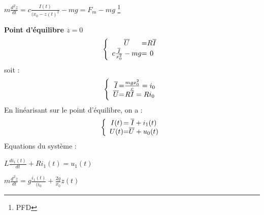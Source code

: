 {{{{\begin{center}
    \Large{$
    m\frac{d^{2}z}{dt} = c\frac{I(t)}{(x_{0} - z(t)^{2}} - mg = F_{m} - mg
    $} \footnote{PFD}
\end{center}
\large{
\textbf{Point d'équilibre $\overline{z} = 0$}
}
\large{
    \[
\left \{
\begin{array}{c @{=} c}
    \overline{U} & R\overline{I} \\
    c\frac{\overline{I}}{x_{0}^{2}} - mg & 0
\end{array}
\right.
\]}
soit :
\large{
    \[
\left \{
\begin{array}{c @{=} c}
    \overline{I} & \frac{mgx_{0}^{2}}{c} = i_{0} \\
    \overline{U} & R\overline{I} = Ri_{0}
\end{array}
\right.
    \]}
En linéarisant sur le point d'équilibre, on a :
\large{
    \[
    \left \{
\begin{array}{c @{=} c}
    I(t) & \overline{I} + i_{1}(t) \\
    U(t) & \overline{U} + u_{0}(t)
\end{array}
\right.
    \]}
\newpage
Equations du système :
\begin{center}
    \Large{$
    L\frac{di_{1}(t)}{dt} + Ri_{1}(t) = u_{1}(t)
    $} 
    \newline

    \Large{$
    m\frac{d^{2}z}{dt} = g\frac{i_{1}(t)}{(i_{0}} + \frac{2g}{x_{0}}z(t)
    $}
    \newline


\end{center}}}}}

